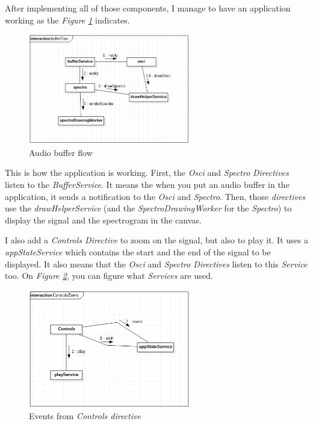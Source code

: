 \documentclass{article}
\begin{document}
After implementing all of those components, I manage to have an application working as the \textit{Figure \ref{audioFlow}} indicates.
\begin{figure}[hb]
\begin{center}
   \includegraphics[width=200pt]{figure_1.png}
      \caption{\label{audioFlow} Audio buffer flow}
\end{center}
\end{figure}

This is how the application is working. First, the \textit{Osci} and \textit{Spectro} \textit{Directives} listen to the \textit{BufferService}. It means the when you put an audio buffer in the application, it sends a notification to the \textit{Osci} and \textit{Spectro}. Then, those \textit{directives} use the \textit{drawHelperService} (and the \textit{SpectroDrawingWorker} for the \textit{Spectro}) to display the signal and the spectrogram in the canvas. 

I also add a \textit{Controls Directive} to zoom on the signal, but also to play it. It uses a \textit{appStateService} which contains the start and the end of the signal to be displayed. It also means that the \textit{Osci} and \textit{Spectro Directives} listen to this \textit{Service} too. On \textit{Figure \ref{controlEvent}}, you can figure what \textit{Services} are used.
\begin{figure}[hb]
\begin{center}
   \includegraphics[width=200pt]{figure_2.png}
      \caption{\label{controlEvent} Events from \textit{Controls directive}}
\end{center}
\end{figure}
\end{document}
